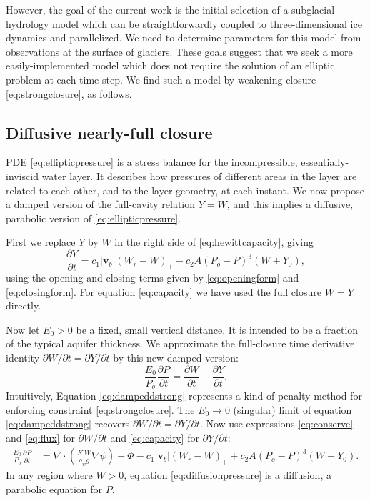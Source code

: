 \documentclass[11pt,final]{amsart}%
\newcommand\bv{\mathbf{v}}
\newcommand{\Div}{\nabla\cdot}
\newcommand{\grad}{\nabla}
\begin{document}
However, the goal of the current work is the initial selection of a subglacial hydrology model which can be straightforwardly coupled to three-dimensional ice dynamics and parallelized.  We need to determine parameters for this model from observations at the surface of glaciers.  These goals suggest that we seek a more easily-implemented model which does not require the solution of an elliptic problem at each time step.  We find such a model by weakening closure \eqref{eq:strongclosure}, as follows.

\subsection*{Diffusive nearly-full closure}  PDE \eqref{eq:ellipticpressure} is a stress balance for the incompressible, essentially-inviscid water layer.  It describes how pressures of different areas in the layer are related to each other, and to the layer geometry, at each instant.  We now propose a damped version of the full-cavity relation $Y=W$, and this implies a diffusive, parabolic version of \eqref{eq:ellipticpressure}.

First we replace $Y$ by $W$ in the right side of \eqref{eq:hewittcapacity}, giving
\begin{equation}
\frac{\partial Y}{\partial t} = c_1 |\bv_b| (W_r - W)_+ - c_2 A (P_o - P)^3 (W+Y_0), \label{eq:capacity}
\end{equation}
using the opening and closing terms given by \eqref{eq:openingform} and \eqref{eq:closingform}.  For equation \eqref{eq:capacity} we have used the full closure $W=Y$ directly.

Now let $E_0>0$ be a fixed, small vertical distance.  It is intended to be a fraction of the typical aquifer thickness.  We approximate the full-closure time derivative identity $\partial W/\partial t = \partial Y/\partial t$ by this new damped version:
\begin{equation}
\frac{E_0}{P_o} \frac{\partial P}{\partial t} =  \frac{\partial W}{\partial t}  - \frac{\partial Y}{\partial t}.\label{eq:dampeddstrong}
\end{equation}
Intuitively, Equation \eqref{eq:dampeddstrong} represents a kind of penalty method \citep{NocedalWright} for enforcing constraint \eqref{eq:strongclosure}.  The $E_0\to 0$ (singular) limit of equation \eqref{eq:dampeddstrong} recovers $\partial W/\partial t = \partial Y/\partial t$.  Now use expressions \eqref{eq:conserve} and \eqref{eq:flux} for $\partial W/\partial t$ and \eqref{eq:capacity} for $\partial Y/\partial t$:
\begin{align}
\frac{E_0}{P_o} \frac{\partial P}{\partial t} &= \Div \left(\frac{K\,W}{\rho_w g} \grad \psi\right) + \Phi - c_1 |\bv_b| (W_r - W)_+  + c_2 A (P_o - P)^3 (W+Y_0). \label{eq:diffusionpressure}
\end{align}
In any region where $W>0$, equation \eqref{eq:diffusionpressure} is a diffusion, a parabolic equation for $P$.
\end{document}

